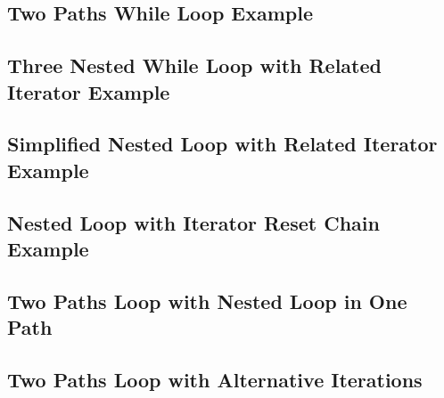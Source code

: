 \subsection{Two Paths While Loop Example}

\subsection{Three Nested While Loop with Related Iterator Example}

\subsection{Simplified Nested Loop with Related Iterator Example}

\subsection{Nested Loop with Iterator Reset Chain Example}

\subsection{Two Paths Loop with Nested Loop in One Path}


\subsection{Two Paths Loop with Alternative Iterations}

